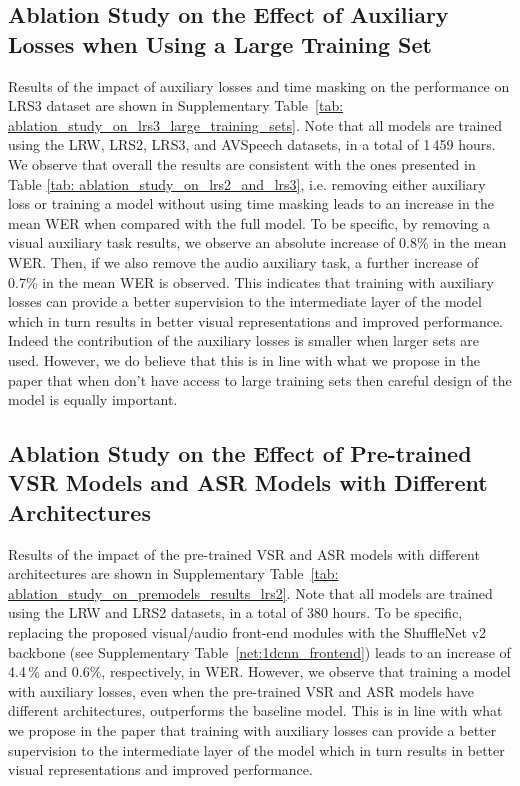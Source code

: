 \documentclass[twocolumn]{article}
\begin{document}
\subsection{Ablation Study on the Effect of Auxiliary Losses when Using a Large Training Set}
Results of the impact of auxiliary losses and time masking on the performance on LRS3 dataset are shown in Supplementary Table~\ref{tab: ablation_study_on_lrs3_large_training_sets}. Note that all models are trained using the LRW, LRS2, LRS3, and AVSpeech datasets, in a total of 1\,459 hours. We observe that overall the results are consistent with the ones presented in Table \ref{tab: ablation_study_on_lrs2_and_lrs3}, i.e. removing either auxiliary loss or training a model without using time masking leads to an increase in the mean WER when compared with the full model. To be specific, by removing a visual auxiliary task results, we observe an absolute increase of 0.8\% in the mean WER. Then, if we also remove the audio auxiliary task, a further increase of 0.7\% in the mean WER is observed. This indicates that training with auxiliary losses can provide a better supervision to the intermediate layer of the model which in turn results in better visual representations and improved performance. Indeed the contribution of the auxiliary losses is smaller when larger sets are used. However, we do believe that this is in line with what we propose in the paper that when don't have access to large training sets then careful design of the model is equally important.

\subsection{Ablation Study on the Effect of Pre-trained VSR Models and ASR Models with Different Architectures}
Results of the impact of the pre-trained VSR and ASR models with different architectures are shown in Supplementary Table~\ref{tab: ablation_study_on_premodels_results_lrs2}. Note that all models are trained using the LRW and LRS2 datasets, in a total of 380 hours. To be specific, replacing the proposed visual/audio front-end modules with the ShuffleNet v2~\cite{ma2018shufflenet} backbone (see Supplementary Table~\ref{net:1dcnn_frontend}) leads to an increase of 4.4\,\% and 0.6\%, respectively, in WER. However, we observe that training a model with auxiliary losses, even when the pre-trained VSR and ASR models have different architectures, outperforms the baseline model. This is in line with what we propose in the paper that training with auxiliary losses can provide a better supervision to the intermediate layer of the model which in turn results in better visual representations and improved performance.
\end{document}
